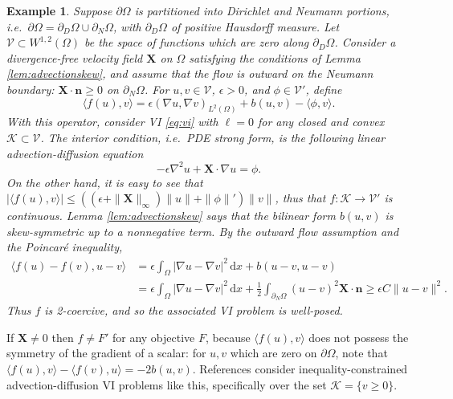\documentclass[letterpaper,final,12pt,reqno]{amsart}
\theoremstyle{cstyle}
\theoremstyle{cstyle*}
\theoremstyle{dstyle}
\newtheorem{example}[theorem]{Example}
\numberwithin{equation}{section}
\numberwithin{figure}{section}
\numberwithin{table}{section}
\numberwithin{theorem}{section}
\newcommand{\eps}{\epsilon}
\newcommand{\grad}{\nabla}
\newcommand{\bn}{\mathbf{n}}
\newcommand{\bX}{\mathbf{X}}
\newcommand{\cK}{\mathcal{K}}
\newcommand{\cV}{\mathcal{V}}
\newcommand{\ip}[2]{\langle#1,#2\rangle}
\newcommand{\dx}{\, \mathrm{d}x}
\begin{document}
\begin{example}  \label{ex:advectiondiffusion}  Suppose $\partial\Omega$ is partitioned into Dirichlet and Neumann portions, i.e.~$\partial\Omega = \partial_D\Omega \cup \partial_N\Omega$, with $\partial_D\Omega$ of positive Hausdorff measure.  Let $\cV \subset W^{1,2}(\Omega)$ be the space of functions which are zero along $\partial_D\Omega$.  Consider a divergence-free velocity field $\bX$ on $\Omega$ satisfying the conditions of Lemma \ref{lem:advectionskew}, and assume that the flow is outward on the Neumann boundary: $\bX \cdot \bn \ge 0$ on $\partial_N\Omega$.  For $u,v \in \cV$, $\eps>0$, and $\phi \in \cV'$, define
\begin{equation}
\ip{f(u)}{v} = \eps \left(\grad u, \grad v\right)_{L^2(\Omega)} + b(u,v) - \ip{\phi}{v}. \label{eq:advectiondiffusion}
\end{equation}
With this operator, consider VI \eqref{eq:vi} with $\ell = 0$ for any closed and convex $\cK \subset \cV$. The interior condition, i.e.~PDE strong form, is the following linear advection-diffusion equation
\begin{equation}
-\eps \grad^2 u + \bX\cdot \grad u = \phi.
\label{eq:advectiondiffusionstrong}
\end{equation}
On the other hand, it is easy to see that $|\ip{f(u)}{v}| \le \left((\eps + \|\bX\|_\infty) \|u\| + \|\phi\|'\right) \|v\|$, thus that $f:\cK \to \cV'$ is continuous.  Lemma \ref{lem:advectionskew} says that the bilinear form $b(u,v)$ is skew-symmetric up to a nonnegative term.  By the outward flow assumption and the Poincar\'e inequality,
\begin{align*}
\ip{f(u)-f(v)}{u-v} &= \eps \int_\Omega |\grad u - \grad v|^2\dx + b(u-v,u-v) \\
                    &= \eps \int_\Omega |\grad u - \grad v|^2\dx + \frac{1}{2} \int_{\partial_N\Omega} (u-v)^2 \bX\cdot\bn \ge \eps C \|u-v\|^2.
\end{align*}
Thus $f$ is 2-coercive, and so the associated VI problem is well-posed.
\end{example}

If $\bX \ne 0$ then $f\ne F'$ for any objective $F$, because $\ip{f(u)}{v}$ does not possess the symmetry of the gradient of a scalar: for $u,v$ which are zero on $\partial \Omega$, note that $\ip{f(u)}{v} - \ip{f(v)}{u} = -2 b(u,v)$.  References \cite{Bueler2021conservation,ChangNakshatrala2017} consider inequality-constrained advection-diffusion VI problems like this, specifically over the set $\cK = \{v\ge 0\}$.
\end{document}
